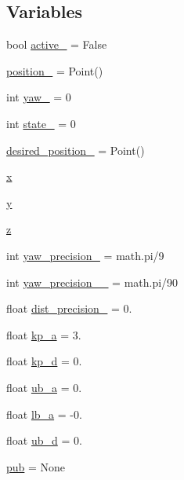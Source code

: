 \subsection*{Variables}
\begin{DoxyCompactItemize}
\item 
bool \hyperlink{namespacego__to__point__service__bug_a904337d36bd7e3e63dc3d862b0f67608}{active\+\_\+} = False
\item 
\hyperlink{namespacego__to__point__service__bug_a8eccd57782f5a63758c2ed6fc429648f}{position\+\_\+} = Point()
\item 
int \hyperlink{namespacego__to__point__service__bug_a92ae1b18b13762d59aa27dd83ea9e04d}{yaw\+\_\+} = 0
\item 
int \hyperlink{namespacego__to__point__service__bug_acf82697453e220209d6f386e1630619a}{state\+\_\+} = 0
\item 
\hyperlink{namespacego__to__point__service__bug_a5c33b74b7f2376e73690f8474fc4db36}{desired\+\_\+position\+\_\+} = Point()
\item 
\hyperlink{namespacego__to__point__service__bug_a6761dc57b29d40d3e6578b775a1e84c2}{x}
\item 
\hyperlink{namespacego__to__point__service__bug_a9eac097a440f4f16c9e7260e5296fd76}{y}
\item 
\hyperlink{namespacego__to__point__service__bug_ac72a9ad64f48ea907c94e25a3718372c}{z}
\item 
int \hyperlink{namespacego__to__point__service__bug_aa27745ad563c25adbac628695bbdd44d}{yaw\+\_\+precision\+\_\+} = math.\+pi/9
\item 
int \hyperlink{namespacego__to__point__service__bug_a2cfb8eb9d839627bee23494c162a1e88}{yaw\+\_\+precision\+\_\+\_\+} = math.\+pi/90
\item 
float \hyperlink{namespacego__to__point__service__bug_a1142014aa3b5c0819cd183c7b4534927}{dist\+\_\+precision\+\_\+} = 0.
\item 
float \hyperlink{namespacego__to__point__service__bug_ab4d1411316c963d5b211e42f78cf3c93}{kp\+\_\+a} = 3.
\item 
float \hyperlink{namespacego__to__point__service__bug_a0aa73d2814be9d22fc2a6e4eaa0afc07}{kp\+\_\+d} = 0.
\item 
float \hyperlink{namespacego__to__point__service__bug_aa2cfb37c171e32902af10e4f4121f92f}{ub\+\_\+a} = 0.
\item 
float \hyperlink{namespacego__to__point__service__bug_a60404a026e5fcd840f8a6f712edfb71f}{lb\+\_\+a} = -\/0.
\item 
float \hyperlink{namespacego__to__point__service__bug_a0ea364ac6b209e590e96109ca6fb7a5c}{ub\+\_\+d} = 0.
\item 
\hyperlink{namespacego__to__point__service__bug_a303812c1ccf752e711d273e93c27293d}{pub} = None
\end{DoxyCompactItemize}


